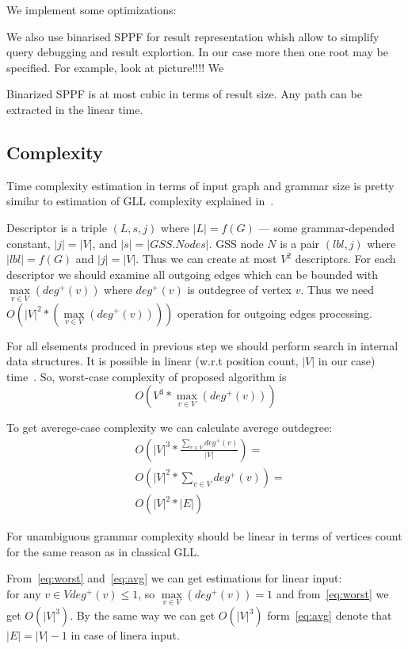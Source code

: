 \documentclass{sig-alternate} %
\begin{document}
We implement some optimizations:~\cite{FastPracticalGLL}

We also use binarised SPPF for result representation whish allow to simplify query debugging and result explortion.
In our case more then one root may be specified. For example, look at picture!!!! 
We 

Binarized SPPF is at most cubic in terms of result size. Any path can be extracted in the linear time.

\subsection{Complexity}

Time complexity estimation in terms of input graph and grammar size is pretty similar to estimation of GLL complexity explained in~\cite{modellingGLL}.

Descriptor is a triple $(L, s, j)$ where $|L| = f(G)$ --- some grammar-depended constant, $|j| = |V|$, and $|s| = |GSS.Nodes|$.
GSS node $N$ is a pair $(lbl, j)$ where $|lbl| = f(G)$ and $|j| = |V|$. 
Thus we can create at most $V^2$ descriptors.
For each descriptor we should examine all outgoing edges which can be bounded with $\max\limits_{v \in V}(deg^+(v))$  where $deg^+(v)$ is outdegree of vertex $v$.
Thus we need $O(|V|^2*(\max\limits_{v \in V}(deg^+(v))))$ operation for outgoing edges processing.

For all elsements produced in previous step we should perform search in internal data structures. It is possible in linear (w.r.t position count, $|V|$ in our case) time~\cite{modellingGLL}.
So, worst-case complexity of proposed algorithm is 
\begin{equation} \label{eq:worst}
O(V^3*\max\limits_{v \in V}(deg^+(v)))
\end{equation}

To get averege-case complexity we can calculate averege outdegree:
\begin{align} \label{eq:avg}
  & O\left(|V|^3*\frac {\sum\limits_{v \in V} deg^+(v)}{|V|}\right) = \\
  & O\left(|V|^2*\sum\limits_{v \in V} deg^+(v)\right) = \\
  & O\left(|V|^2*|E|\right) 
\end{align}

For unambiguous grammar complexity should be linear in terms of vertices count for the same reason as in classical GLL.

From~\ref{eq:worst} and~\ref{eq:avg} we can get estimations for linear input: $\text{for any } v \in V deg^+(v) \leq 1$, so $\max\limits_{v \in V}(deg^+(v))  = 1 $ and from~\ref{eq:worst} we get $O(|V|^3)$. 
By the same way we can get $O(|V|^3)$ form~\ref{eq:avg} denote that $|E| = |V| - 1$ in case of linera input. 
\end{document}
